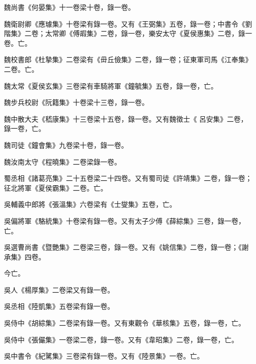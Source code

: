 \begin{pinyinscope}
 魏尚書《何晏集》十一卷梁十卷，錄一卷。



 魏衛尉卿《應璩集》十卷梁有錄一卷。又有《王弼集》五卷，錄一卷；中書令《劉階集》二卷；太常卿《傅嘏集》二卷，錄一卷，樂安太守《夏侯惠集》二卷，錄一卷。亡。



 魏校書郎《杜摯集》二卷梁有《毌丘儉集》二卷，錄一卷；征東軍司馬《江奉集》二卷。亡。



 魏太常《夏侯玄集》三卷梁有車騎將軍《鐘毓集》五卷，錄一卷，亡。



 魏步兵校尉《阮籍集》十卷梁十三卷，錄一卷。



 魏中散大夫《嵇康集》十三卷梁十五卷，錄一卷。又有魏徵士《
 呂安集》二卷，錄一卷，亡。



 魏司徒《鐘會集》九卷梁十卷，錄一卷。



 魏汝南太守《程曉集》二卷梁錄一卷。



 蜀丞相《諸葛亮集》二十五卷梁二十四卷。又有蜀司徒《許靖集》二卷，錄一卷；征北將軍《夏侯霸集》二卷。亡。



 吳輔義中郎將《張溫集》六卷梁有《士燮集》五卷，亡。



 吳偏將軍《駱統集》十卷梁有錄一卷。又有太子少傅《薛綜集》三卷，錄一卷，亡。



 吳選曹尚書《暨艷集》二卷梁三卷，錄一卷。又有《姚信集》二卷，錄一卷；《謝承集》四卷。



 今亡。



 吳人《楊厚集》二卷梁又有錄一卷。



 吳丞相《陸凱集》五卷梁有錄一卷。



 吳侍中《胡綜集》二卷梁有錄一卷。又有東觀令《華核集》五卷，錄一卷，亡。



 吳侍中《張儼集》一卷梁二卷，錄一卷。又有《韋昭集》二卷，錄一卷，亡。



 吳中書令《紀騭集》三卷梁有錄一卷。又有《陸景集》一卷。亡。




\end{pinyinscope}
